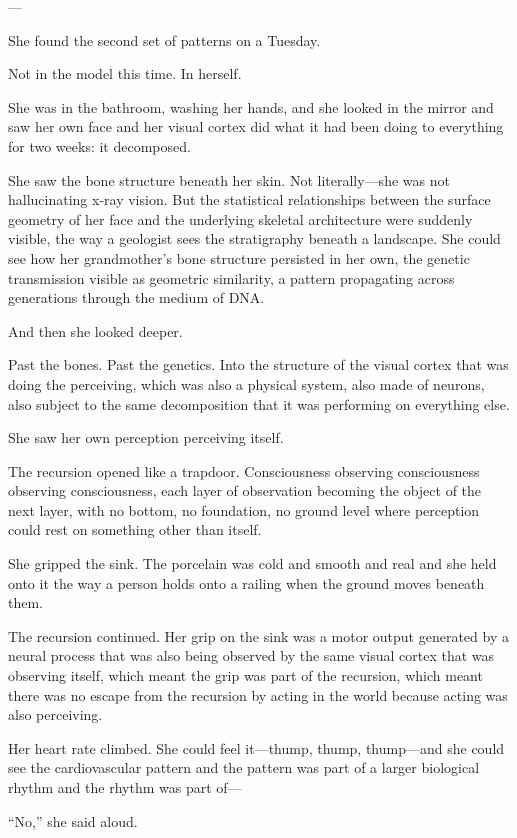 ---

She found the second set of patterns on a Tuesday.

Not in the model this time. In herself.

She was in the bathroom, washing her hands, and she looked in the mirror and saw her own face and her visual cortex did what it had been doing to everything for two weeks: it decomposed.

She saw the bone structure beneath her skin. Not literally---she was not hallucinating x-ray vision. But the statistical relationships between the surface geometry of her face and the underlying skeletal architecture were suddenly visible, the way a geologist sees the stratigraphy beneath a landscape. She could see how her grandmother's bone structure persisted in her own, the genetic transmission visible as geometric similarity, a pattern propagating across generations through the medium of DNA.

And then she looked deeper.

Past the bones. Past the genetics. Into the structure of the visual cortex that was doing the perceiving, which was also a physical system, also made of neurons, also subject to the same decomposition that it was performing on everything else.

She saw her own perception perceiving itself.

The recursion opened like a trapdoor. Consciousness observing consciousness observing consciousness, each layer of observation becoming the object of the next layer, with no bottom, no foundation, no ground level where perception could rest on something other than itself.

She gripped the sink. The porcelain was cold and smooth and real and she held onto it the way a person holds onto a railing when the ground moves beneath them.

The recursion continued. Her grip on the sink was a motor output generated by a neural process that was also being observed by the same visual cortex that was observing itself, which meant the grip was part of the recursion, which meant there was no escape from the recursion by acting in the world because acting was also perceiving.

Her heart rate climbed. She could feel it---thump, thump, thump---and she could see the cardiovascular pattern and the pattern was part of a larger biological rhythm and the rhythm was part of---

``No,'' she said aloud.

